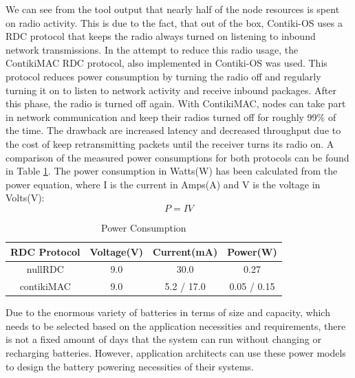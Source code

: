 \documentclass{sig-alternate-05-2015}
\begin{document}
We can see from the tool output that nearly half of the node resources is spent on radio activity. This is due to the fact, that out of the box, Contiki-OS uses a \gls{RDC} protocol that keeps the radio always turned on listening to inbound network transmissions. In the attempt to reduce this radio usage, the ContikiMAC\cite{Dunkels2011} \gls{RDC} protocol, also implemented in Contiki-OS was used.
This protocol reduces power consumption by turning the radio off and regularly turning it on to listen to network activity and receive inbound packages. After this phase, the radio is turned off again. With ContikiMAC, nodes can take part in network communication and keep their radios turned off for roughly 99\% of the time\cite{Dunkels2011}. The drawback are increased latency and decreased throughput due to the cost of keep retransmitting packets until the receiver turns its radio on. A comparison of the measured power consumptions for both protocols can be found in Table \ref{tab:power_consumptions}. The power consumption in Watts(W) has been calculated from the power equation, where I is the current in Amps(A) and V is the voltage in Volts(V):
\begin{equation}
P = I  V
\end{equation} 

\begin{table}
\centering
\caption{Power Consumption}
\label{tab:power_consumptions}
\begin{tabular}{|c|c|c|c|} \hline
\gls{RDC} Protocol&Voltage(V)&Current(mA)&Power(W)\\ \hline
nullRDC& 9.0& 30.0&0.27\\ \hline
contikiMAC& 9.0& 5.2 / 17.0&0.05 / 0.15\\
\hline\end{tabular}
\end{table}

Due to the enormous variety of batteries in terms of size and capacity, which needs to be selected based on the application necessities and requirements, there is not a fixed amount of days that the system can run without changing or recharging batteries. However, application architects can use these power models to design the battery powering necessities of their systems. 
\end{document}

